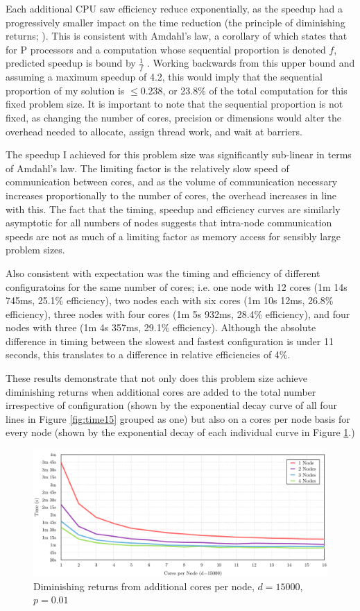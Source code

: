 \documentclass[12pt]{article}
\begin{document}
Each additional CPU saw efficiency reduce exponentially, as the speedup had a progressively smaller impact on the time reduction (the principle of diminishing returns; \citep{Amdahl}). This is consistent with Amdahl's law, a corollary of which states that for P processors and a computation whose sequential proportion is denoted $f$, predicted speedup is bound by $\frac{1}{f}$ \citep{springer}. Working backwards from this upper bound and assuming a maximum speedup of 4.2, this would imply that the sequential proportion of my solution is $\leq 0.238$, or 23.8\% of the total computation for this fixed problem size. It is important to note that the sequential proportion is not fixed, as changing the number of cores, precision or dimensions would alter the overhead needed to allocate, assign thread work, and wait at barriers.

The speedup I achieved for this problem size was significantly sub-linear in terms of Amdahl's law. The limiting factor is the relatively slow speed of communication between cores, and as the volume of communication necessary increases proportionally to the number of cores, the overhead increases in line with this. The fact that the timing, speedup and efficiency curves are similarly asymptotic for all numbers of nodes suggests that intra-node communication speeds are not as much of a limiting factor as memory access for sensibly large problem sizes.

Also consistent with expectation was the timing and efficiency of different configuratoins for the same number of cores; i.e. one node with 12 cores (1m 14s 745ms, 25.1\% efficiency), two nodes each with six cores (1m 10s 12ms, 26.8\% efficiency), three nodes with four cores (1m 5s 932ms, 28.4\% efficiency), and four nodes with three (1m 4s 357ms, 29.1\% efficiency). Although the absolute difference in timing between the slowest and fastest configuration is under 11 seconds, this translates to a difference in relative efficiencies of 4\%.

These results demonstrate that not only does this problem size achieve diminishing returns when additional cores are added to the total number irrespective of configuration (shown by the exponential decay curve of all four lines in Figure \ref{fig:time15} grouped as one) but also on a cores per node basis for every node (shown by the exponential decay of each individual curve in Figure \ref{fig:cpn}.)
\begin{figure}[htbp!]
        \centering\includegraphics[width=\textwidth]{img/cpn.pdf}
        \caption{Diminishing returns from additional cores per node, $d=15000$, $p=0.01$}
        \label{fig:cpn}
\end{figure}
\end{document}
